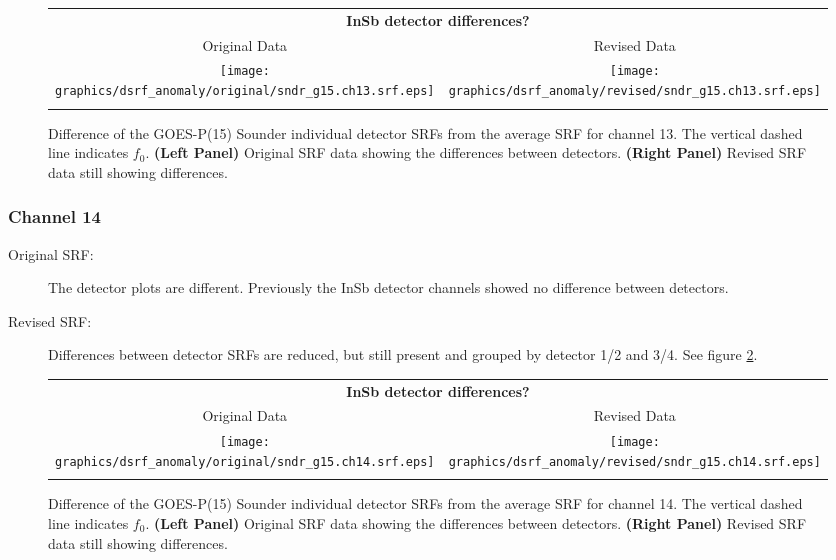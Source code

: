 \begin{figure}[htp]
  \centering
  \begin{tabular}{c c}
    \multicolumn{2}{c}{\textsf{\bfseries InSb detector differences?}} \\
    \hspace{1.5em}\textsf{Original Data} &
    \hspace{1.5em}\textsf{Revised Data} \\
    \texttt{[image: graphics/dsrf\_anomaly/original/sndr\_g15.ch13.srf.eps]} &
    \texttt{[image: graphics/dsrf\_anomaly/revised/sndr\_g15.ch13.srf.eps]} \\\\
  \end{tabular}
  \caption{Difference of the GOES-P(15) Sounder individual detector SRFs from the average SRF for channel 13. The vertical dashed line indicates $f_0$. \textbf{(Left Panel)} Original SRF data showing the differences between detectors. \textbf{(Right Panel)} Revised SRF data still showing differences.}
  \label{fig:sndr_g15.ch13.dsrf_anomaly}
\end{figure}

\subsubsection{Channel 14}
\begin{description}
  \item[Original SRF:] The detector plots are different. Previously the InSb detector channels showed no difference between detectors.
  \item[Revised SRF:]  Differences between detector SRFs are reduced, but still present and grouped by detector 1/2 and 3/4. See figure \ref{fig:sndr_g15.ch14.dsrf_anomaly}.
\end{description}

\begin{figure}[htp]
  \centering
  \begin{tabular}{c c}
    \multicolumn{2}{c}{\textsf{\bfseries InSb detector differences?}} \\
    \hspace{1.5em}\textsf{Original Data} &
    \hspace{1.5em}\textsf{Revised Data} \\
    \texttt{[image: graphics/dsrf\_anomaly/original/sndr\_g15.ch14.srf.eps]} &
    \texttt{[image: graphics/dsrf\_anomaly/revised/sndr\_g15.ch14.srf.eps]} \\\\
  \end{tabular}
  \caption{Difference of the GOES-P(15) Sounder individual detector SRFs from the average SRF for channel 14. The vertical dashed line indicates $f_0$. \textbf{(Left Panel)} Original SRF data showing the differences between detectors. \textbf{(Right Panel)} Revised SRF data still showing differences.}
  \label{fig:sndr_g15.ch14.dsrf_anomaly}
\end{figure}

